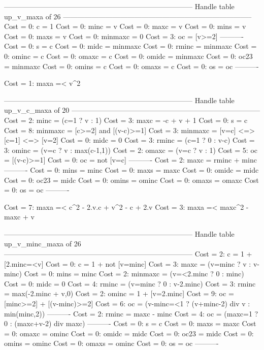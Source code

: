 --------------------------------------------------------------------------------
Handle table up_v_maxa of 26
--------------------------------------------------------------------------------
Cost =  0:  c       = 1
Cost =  0:  minc    = v
Cost =  0:  maxc    = v
Cost =  0:  mins    = v
Cost =  0:  maxs    = v
Cost =  0:  minmaxc = 0
Cost =  3:  oc      = [v>=2]
----------
Cost =  0:  s       = c
Cost =  0:  midc    = minmaxc
Cost =  0:  rminc   = minmaxc
Cost =  0:  ominc   = c
Cost =  0:  omaxc   = c
Cost =  0:  omidc   = minmaxc
Cost =  0:  oc23    = minmaxc
Cost =  0:  omins   = c
Cost =  0:  omaxs   = c
Cost =  0:  os      = oc
----------

Cost =  1:  maxa =< v^2

--------------------------------------------------------------------------------
Handle table up_v_c_maxa of 20
--------------------------------------------------------------------------------
Cost =  2:  minc    = (c=1 ? v : 1)
Cost =  3:  maxc    = -c + v + 1
Cost =  0:  s       = c
Cost =  8:  minmaxc = [c>=2] and [(v-c)>=1]
Cost =  3:  minmaxc = [v=c] <=> [c=1] <=> [v=2]
Cost =  0:  midc    = 0
Cost =  3:  rminc   = (c=1 ? 0 : v-c)
Cost =  3:  ominc   = (v=c ? v : max(c-1,1))
Cost =  2:  omaxc   = (v=c ? v : 1)
Cost =  5:  oc      = [(v-c)>=1]
Cost =  0:  oc      = not [v=c]
----------
Cost =  2:  maxc    = rminc + minc
----------
Cost =  0:  mins    = minc
Cost =  0:  maxs    = maxc
Cost =  0:  omidc   = midc
Cost =  0:  oc23    = midc
Cost =  0:  omins   = ominc
Cost =  0:  omaxs   = omaxc
Cost =  0:  os      = oc
----------

Cost =  7:  maxa =< c^2 - 2.v.c + v^2 - c + 2.v
Cost =  3:  maxa =< maxc^2 - maxc + v

--------------------------------------------------------------------------------
Handle table up_v_minc_maxa of 26
--------------------------------------------------------------------------------
Cost =  2:  c       = 1 + [2.minc=<v]
Cost =  0:  c       = 1 + not [v=minc]
Cost =  3:  maxc    = (v=minc ? v : v-minc)
Cost =  0:  mins    = minc
Cost =  2:  minmaxc = (v=<2.minc ? 0 : minc)
Cost =  0:  midc    = 0
Cost =  4:  rminc   = (v=minc ? 0 : v-2.minc)
Cost =  3:  rminc   = max(-2.minc + v,0)
Cost =  2:  ominc   = 1 + [v=2.minc]
Cost =  9:  oc      = [minc>=2] + [(v-minc)>=2]
Cost =  6:  oc      = (v-minc=<1 ? (v+minc-2) div v : min(minc,2))
----------
Cost =  2:  rminc   = maxc - minc
Cost =  4:  oc      = (maxc=1 ? 0 : (maxc+v-2) div maxc)
----------
Cost =  0:  s       = c
Cost =  0:  maxs    = maxc
Cost =  0:  omaxc   = ominc
Cost =  0:  omidc   = midc
Cost =  0:  oc23    = midc
Cost =  0:  omins   = ominc
Cost =  0:  omaxs   = ominc
Cost =  0:  os      = oc
----------

